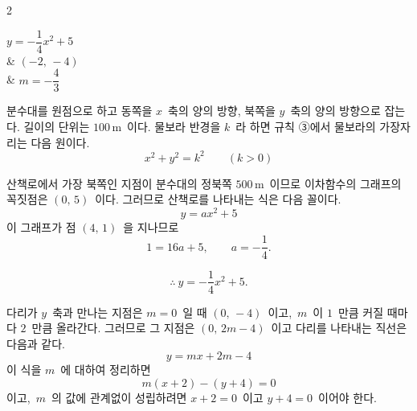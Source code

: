 \documentclass[10pt,fleqn]{article}
\begin{document}
\begin{multicols*}{2}
\begin{dmanslist}
 $y=-\dfrac14x^{2}+5$\\
&  $(-2,\,-4)$\\
&  $m=-\dfrac43$
\end{dmanslist}

분수대를 원점으로 하고 동쪽을 $x$\ 축의 양의 방향, 북쪽을 $y$\ 축의 양의 방향으로 잡는다. 길이의 단위는 $100\,\mathrm{m}$\ 이다. 물보라 반경을 $k$\ 라 하면 규칙 ③에서 물보라의 가장자리는 다음 원이다.
$$x^{2}+y^{2}=k^{2}\qquad(k>0)$$

 산책로에서 가장 북쪽인 지점이 분수대의 정북쪽 $500\,\mathrm{m}$\ 이므로 이차함수의 그래프의 꼭짓점은 $(0,\,5)$\ 이다. 그러므로 산책로를 나타내는 식은 다음 꼴이다.
$$y=ax^{2}+5$$
이 그래프가 점 $(4,\,1)$\ 을 지나므로
$$1=16a+5,\qquad a=-\dfrac14.$$

$$\therefore\ y=-\dfrac14x^{2}+5.$$

 다리가 $y$\ 축과 만나는 지점은 $m=0$\ 일 때 $(0,\,-4)$\ 이고,\ $m$\ 이 $1$\ 만큼 커질 때마다 $2$\ 만큼 올라간다. 그러므로 그 지점은 $(0,\,2m-4)$\ 이고 다리를 나타내는 직선은 다음과 같다.
$$y=mx+2m-4$$
이 식을 $m$\ 에 대하여 정리하면
$$m(x+2)-(y+4)=0$$
이고,\ $m$\ 의 값에 관계없이 성립하려면 $x+2=0$\ 이고 $y+4=0$\ 이어야 한다.


\end{multicols*}
\end{document}
